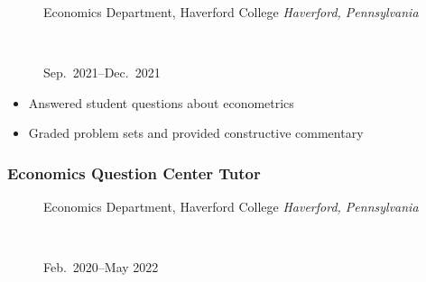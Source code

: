\documentclass[
  letterpaper,
  DIV=11,
  numbers=noendperiod]{scrartcl}
\providecommand{\tightlist}{%
  \setlength{\itemsep}{0pt}\setlength{\parskip}{0pt}}\usepackage{longtable,booktabs,array}
\begin{document}
\begin{figure}

\begin{minipage}[t]{0.49\linewidth}

{\centering 

\RaggedRight Economics Department, Haverford College \newline
\emph{Haverford, Pennsylvania}

}

\end{minipage}%
%
\begin{minipage}[t]{0.02\linewidth}

{\centering 

~

}

\end{minipage}%
%
\begin{minipage}[t]{0.49\linewidth}

{\centering 

\RaggedLeft Sep.~2021--Dec.~2021

}

\end{minipage}%

\end{figure}

\begin{itemize}
\tightlist
\item
  Answered student questions about econometrics
\item
  Graded problem sets and provided constructive commentary
\end{itemize}

\hypertarget{economics-question-center-tutor}{%
\subsubsection{Economics Question Center
Tutor}\label{economics-question-center-tutor}}

\begin{figure}

\begin{minipage}[t]{0.49\linewidth}

{\centering 

\RaggedRight Economics Department, Haverford College \newline
\emph{Haverford, Pennsylvania}

}

\end{minipage}%
%
\begin{minipage}[t]{0.02\linewidth}

{\centering 

~

}

\end{minipage}%
%
\begin{minipage}[t]{0.49\linewidth}

{\centering 

\RaggedLeft Feb.~2020--May 2022

}

\end{minipage}%

\end{figure}
\end{document}
